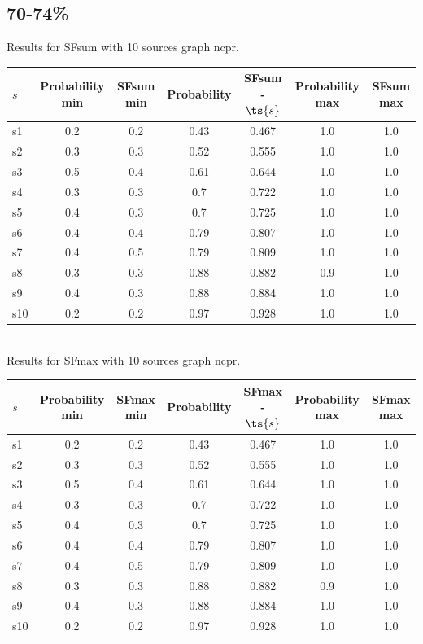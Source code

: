 \documentclass{article}
\begin{document}
\newpage

\subsection{70-74\%}

\noindent Results for SFsum with 10 sources graph ncpr.

\noindent\begin{tabular}{|l|c|c|c|c|c|c|}
\hline
$s$& Probability min & SFsum min & Probability & SFsum - $\ts{s}$ & Probability max & SFsum max\\
\hline
s1 &0.2 & 0.2 & 0.43 & 0.467 & 1.0 & 1.0\\
\hline
s2 &0.3 & 0.3 & 0.52 & 0.555 & 1.0 & 1.0\\
\hline
s3 &0.5 & 0.4 & 0.61 & 0.644 & 1.0 & 1.0\\
\hline
s4 &0.3 & 0.3 & 0.7 & 0.722 & 1.0 & 1.0\\
\hline
s5 &0.4 & 0.3 & 0.7 & 0.725 & 1.0 & 1.0\\
\hline
s6 &0.4 & 0.4 & 0.79 & 0.807 & 1.0 & 1.0\\
\hline
s7 &0.4 & 0.5 & 0.79 & 0.809 & 1.0 & 1.0\\
\hline
s8 &0.3 & 0.3 & 0.88 & 0.882 & 0.9 & 1.0\\
\hline
s9 &0.4 & 0.3 & 0.88 & 0.884 & 1.0 & 1.0\\
\hline
s10 &0.2 & 0.2 & 0.97 & 0.928 & 1.0 & 1.0\\
\hline
\end{tabular}\\

\noindent Results for SFmax with 10 sources graph ncpr.

\noindent\begin{tabular}{|l|c|c|c|c|c|c|}
\hline
$s$& Probability min & SFmax min & Probability & SFmax - $\ts{s}$ & Probability max & SFmax max\\
\hline
s1 &0.2 & 0.2 & 0.43 & 0.467 & 1.0 & 1.0\\
\hline
s2 &0.3 & 0.3 & 0.52 & 0.555 & 1.0 & 1.0\\
\hline
s3 &0.5 & 0.4 & 0.61 & 0.644 & 1.0 & 1.0\\
\hline
s4 &0.3 & 0.3 & 0.7 & 0.722 & 1.0 & 1.0\\
\hline
s5 &0.4 & 0.3 & 0.7 & 0.725 & 1.0 & 1.0\\
\hline
s6 &0.4 & 0.4 & 0.79 & 0.807 & 1.0 & 1.0\\
\hline
s7 &0.4 & 0.5 & 0.79 & 0.809 & 1.0 & 1.0\\
\hline
s8 &0.3 & 0.3 & 0.88 & 0.882 & 0.9 & 1.0\\
\hline
s9 &0.4 & 0.3 & 0.88 & 0.884 & 1.0 & 1.0\\
\hline
s10 &0.2 & 0.2 & 0.97 & 0.928 & 1.0 & 1.0\\
\hline
\end{tabular}\\
\end{document}
